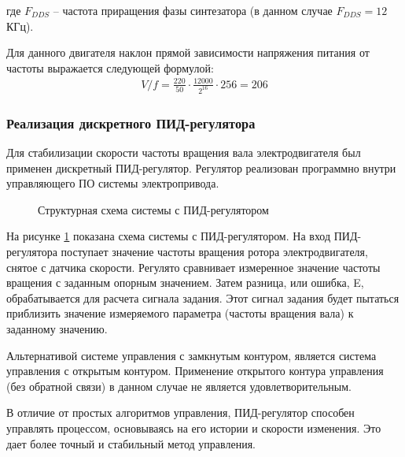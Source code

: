         где $F_{DDS}$ -- частота приращения фазы синтезатора (в данном случае
        $F_{DDS} = 12$ КГц).

        Для данного двигателя наклон прямой зависимости напряжения питания от
        частоты выражается следующей формулой:
        \begin{gather*}
            V/f = \frac{220}{50} \cdot \frac{12000}{2^{16}} \cdot 256 = 206
        \end{gather*}

    \subsubsection{Реализация дискретного ПИД-регулятора}
        Для стабилизации скорости частоты вращения вала электродвигателя был
        применен дискретный ПИД-регулятор. Регулятор реализован программно
        внутри управляющего ПО системы электропривода.

        \begin{figure}[h!]
            \caption{Структурная схема системы с ПИД-регулятором}
            \label{fig:system-with-pid}
        \end{figure}

        На рисунке \ref{fig:system-with-pid} показана схема системы с
        ПИД-регулятором. На вход ПИД-регулятора поступает значение частоты
        вращения ротора электродвигателя, снятое с датчика скорости. Регулято
        сравнивает измеренное значение частоты вращения  с заданным опорным
        значением. Затем разница, или ошибка, E, обрабатывается для расчета
        сигнала задания. Этот сигнал задания будет пытаться приблизить значение
        измеряемого параметра (частоты вращения вала) к заданному значению.

        Альтернативой системе управления с замкнутым контуром, является система
        управления с открытым контуром. Применение открытого контура управления
        (без обратной связи) в данном случае не является удовлетворительным.

        В отличие от простых алгоритмов управления, ПИД-регулятор способен
        управлять процессом, основываясь на его истории и скорости изменения.
        Это дает более точный и стабильный метод управления.


